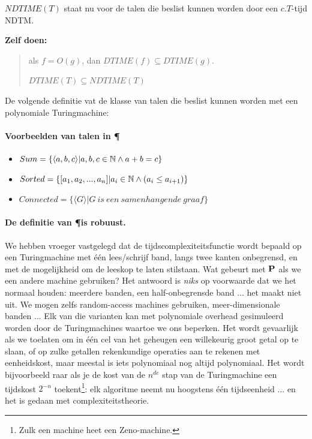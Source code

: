 $NDTIME(T)$ staat nu voor de talen die beslist kunnen worden door een
$c.T$-tijd NDTM.

{\bf Zelf doen:}
\begin{verse}
als $f = O(g)$, dan $DTIME(f) \subseteq DTIME(g)$.

$DTIME(T) \subseteq NDTIME(T)$
\end{verse}

De volgende definitie vat de klasse van talen die beslist kunnen
worden met een polynomiale Turingmachine:


\paragraph{Voorbeelden van talen in \P}
\begin{itemize}
\item 
$Sum = \{\langle a,b,c \rangle| a,b,c \in \N \wedge a+b=c\}$
\item 
$Sorted = \{[a_1,a_2,...,a_n]| a_i \in \N \wedge (a_i \leq a_{i+1})\}$
\item 
$Connected = \{\langle G \rangle|G~is~een~samenhangende~graaf\}$
\end{itemize}

\paragraph{De definitie van \P is robuust.} 
We hebben vroeger vastgelegd dat de tijdscomplexiteitsfunctie wordt
bepaald op een Turingmachine met \'{e}\'{e}n lees/schrijf band, langs
twee kanten onbegrensd, en met de mogelijkheid om de leeskop te laten
stilstaan. Wat gebeurt met $\P$ als we een andere machine gebruiken?
Het antwoord is {\em niks} op voorwaarde dat we het normaal
houden: meerdere banden, een half-onbegrensde band ... het maakt niet
uit. We mogen zelfs random-access machines gebruiken,
meer-dimensionale banden ... Elk van die varianten kan met polynomiale
overhead gesimuleerd worden door de Turingmachines waartoe we ons
beperken. Het wordt gevaarlijk als we toelaten om in \'{e}\'{e}n cel
van het geheugen een willekeurig groot getal op te slaan, of op zulke
getallen rekenkundige operaties aan te rekenen met eenheidskost, maar
meestal is iets polynomiaal nog altijd polynomiaal. Het wordt
bijvoorbeeld raar als je de kost van de $n^{de}$ stap van de
Turingmachine een tijdskost $2^{-n}$ toekent\footnote{Zulk een machine
  heet een Zeno-machine.}: elk algoritme neemt nu hoogstens
\'{e}\'{e}n tijdseenheid ... en het is gedaan met
complexiteitstheorie.


